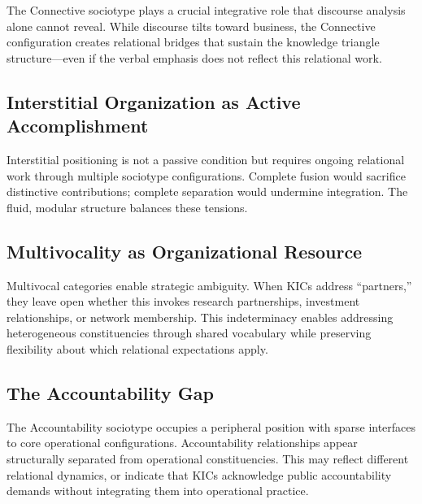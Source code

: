 \documentclass[../main.tex]{subfiles}
\begin{document}
The Connective sociotype plays a crucial integrative role that discourse analysis alone cannot reveal. While discourse tilts toward business, the Connective configuration creates relational bridges that sustain the knowledge triangle structure---even if the verbal emphasis does not reflect this relational work.

\subsection{Interstitial Organization as Active Accomplishment}

Interstitial positioning is not a passive condition but requires ongoing relational work through multiple sociotype configurations. Complete fusion would sacrifice distinctive contributions; complete separation would undermine integration. The fluid, modular structure balances these tensions.

\subsection{Multivocality as Organizational Resource}

Multivocal categories enable strategic ambiguity. When KICs address ``partners,'' they leave open whether this invokes research partnerships, investment relationships, or network membership. This indeterminacy enables addressing heterogeneous constituencies through shared vocabulary while preserving flexibility about which relational expectations apply.

\subsection{The Accountability Gap}

The Accountability sociotype occupies a peripheral position with sparse interfaces to core operational configurations. Accountability relationships appear structurally separated from operational constituencies. This may reflect different relational dynamics, or indicate that KICs acknowledge public accountability demands without integrating them into operational practice.
\end{document}
